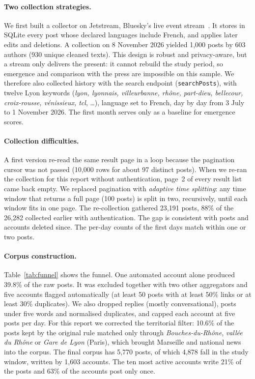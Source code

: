 \documentclass[pdflatex,sn-mathphys-num]{sn-jnl}
\begin{document}
\paragraph{Two collection strategies.} We first built a collector on Jetstream, Bluesky's live event stream~\cite{bskyapi}. It stores in SQLite every post whose declared languages include French, and applies later edits and deletions. A collection on 8 November 2026 yielded 1,000 posts by 603 authors (930 unique cleaned texts). This design is robust and privacy-aware, but a stream only delivers the present: it cannot rebuild the study period, so emergence and comparison with the press are impossible on this sample. We therefore also collected history with the search endpoint (\texttt{searchPosts}), with twelve Lyon keywords (\emph{lyon, lyonnais, villeurbanne, rh\^one, part-dieu, bellecour, croix-rousse, v\'enissieux, tcl}, \dots), language set to French, day by day from 3 July to 1 November 2026. The first month serves only as a baseline for emergence scores.

\paragraph{Collection difficulties.} A first version re-read the same result page in a loop because the pagination cursor was not passed (10,000 rows for about 97 distinct posts). When we re-ran the collection for this report without authentication, page~2 of every result list came back empty. We replaced pagination with \emph{adaptive time splitting}: any time window that returns a full page (100 posts) is split in two, recursively, until each window fits in one page. The re-collection gathered 23,191 posts, 88\% of the 26,282 collected earlier with authentication. The gap is consistent with posts and accounts deleted since. The per-day counts of the first days match within one or two posts.

\paragraph{Corpus construction.} Table~\ref{tab:funnel} shows the funnel. One automated account alone produced 39.8\% of the raw posts. It was excluded together with two other aggregators and five accounts flagged automatically (at least 50 posts with at least 50\% links or at least 30\% duplicates). We also dropped replies (mostly conversational), posts under five words and normalised duplicates, and capped each account at five posts per day. For this report we corrected the territorial filter: 10.6\% of the posts kept by the original rule matched only through \emph{Bouches-du-Rh\^one}, \emph{vall\'ee du Rh\^one} or \emph{Gare de Lyon} (Paris), which brought Marseille and national news into the corpus. The final corpus has 5,770 posts, of which 4,878 fall in the study window, written by 1,603 accounts. The ten most active accounts write 21\% of the posts and 63\% of the accounts post only once.
\end{document}
